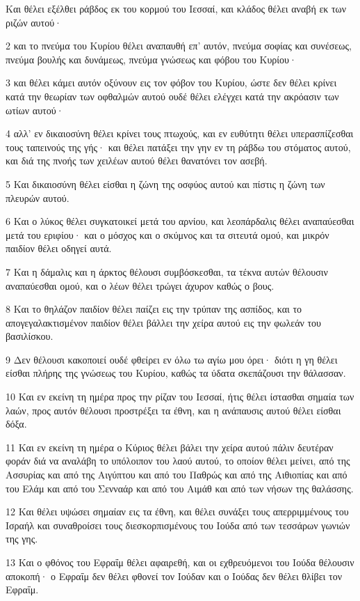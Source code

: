 \par Και θέλει εξέλθει ράβδος εκ του κορμού του Ιεσσαί, και κλάδος θέλει αναβή εκ των ριζών αυτού·
\par 2 και το πνεύμα του Κυρίου θέλει αναπαυθή επ' αυτόν, πνεύμα σοφίας και συνέσεως, πνεύμα βουλής και δυνάμεως, πνεύμα γνώσεως και φόβου του Κυρίου·
\par 3 και θέλει κάμει αυτόν οξύνουν εις τον φόβον του Κυρίου, ώστε δεν θέλει κρίνει κατά την θεωρίαν των οφθαλμών αυτού ουδέ θέλει ελέγχει κατά την ακρόασιν των ωτίων αυτού·
\par 4 αλλ' εν δικαιοσύνη θέλει κρίνει τους πτωχούς, και εν ευθύτητι θέλει υπερασπίζεσθαι τους ταπεινούς της γής· και θέλει πατάξει την γην εν τη ράβδω του στόματος αυτού, και διά της πνοής των χειλέων αυτού θέλει θανατόνει τον ασεβή.
\par 5 Και δικαιοσύνη θέλει είσθαι η ζώνη της οσφύος αυτού και πίστις η ζώνη των πλευρών αυτού.
\par 6 Και ο λύκος θέλει συγκατοικεί μετά του αρνίου, και λεοπάρδαλις θέλει αναπαύεσθαι μετά του εριφίου· και ο μόσχος και ο σκύμνος και τα σιτευτά ομού, και μικρόν παιδίον θέλει οδηγεί αυτά.
\par 7 Και η δάμαλις και η άρκτος θέλουσι συμβόσκεσθαι, τα τέκνα αυτών θέλουσιν αναπαύεσθαι ομού, και ο λέων θέλει τρώγει άχυρον καθώς ο βους.
\par 8 Και το θηλάζον παιδίον θέλει παίζει εις την τρύπαν της ασπίδος, και το απογεγαλακτισμένον παιδίον θέλει βάλλει την χείρα αυτού εις την φωλεάν του βασιλίσκου.
\par 9 Δεν θέλουσι κακοποιεί ουδέ φθείρει εν όλω τω αγίω μου όρει· διότι η γη θέλει είσθαι πλήρης της γνώσεως του Κυρίου, καθώς τα ύδατα σκεπάζουσι την θάλασσαν.
\par 10 Και εν εκείνη τη ημέρα προς την ρίζαν του Ιεσσαί, ήτις θέλει ίστασθαι σημαία των λαών, προς αυτόν θέλουσι προστρέξει τα έθνη, και η ανάπαυσις αυτού θέλει είσθαι δόξα.
\par 11 Και εν εκείνη τη ημέρα ο Κύριος θέλει βάλει την χείρα αυτού πάλιν δευτέραν φοράν διά να αναλάβη το υπόλοιπον του λαού αυτού, το οποίον θέλει μείνει, από της Ασσυρίας και από της Αιγύπτου και από του Παθρώς και από της Αιθιοπίας και από του Ελάμ και από του Σενναάρ και από του Αιμάθ και από των νήσων της θαλάσσης.
\par 12 Και θέλει υψώσει σημαίαν εις τα έθνη, και θέλει συνάξει τους απερριμμένους του Ισραήλ και συναθροίσει τους διεσκορπισμένους του Ιούδα από των τεσσάρων γωνιών της γης.
\par 13 Και ο φθόνος του Εφραΐμ θέλει αφαιρεθή, και οι εχθρευόμενοι του Ιούδα θέλουσιν αποκοπή· ο Εφραΐμ δεν θέλει φθονεί τον Ιούδαν και ο Ιούδας δεν θέλει θλίβει τον Εφραΐμ.
